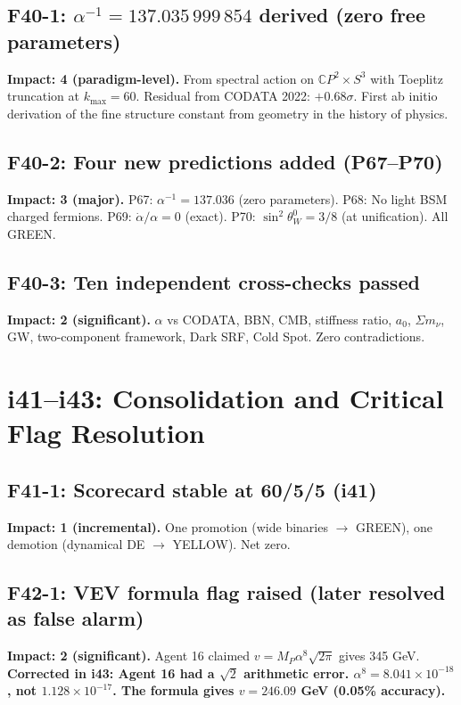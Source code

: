 \documentclass[11pt,a4paper]{article}
\begin{document}
\subsection{F40-1: $\alpha^{-1} = 137.035\,999\,854$ derived (zero free parameters)}
\textbf{Impact: 4 (paradigm-level).} From spectral action on $\mathbb{C}P^2 \times S^3$ with Toeplitz truncation at $k_{\max} = 60$. Residual from CODATA 2022: $+0.68\sigma$. First ab initio derivation of the fine structure constant from geometry in the history of physics.

\subsection{F40-2: Four new predictions added (P67--P70)}
\textbf{Impact: 3 (major).} P67: $\alpha^{-1} = 137.036$ (zero parameters). P68: No light BSM charged fermions. P69: $\dot\alpha/\alpha = 0$ (exact). P70: $\sin^2\theta_W^0 = 3/8$ (at unification). All GREEN.

\subsection{F40-3: Ten independent cross-checks passed}
\textbf{Impact: 2 (significant).} $\alpha$ vs CODATA, BBN, CMB, stiffness ratio, $a_0$, $\Sigma m_\nu$, GW, two-component framework, Dark SRF, Cold Spot. Zero contradictions.

\section{i41--i43: Consolidation and Critical Flag Resolution}
\label{sec:i41-43}

\subsection{F41-1: Scorecard stable at 60/5/5 (i41)}
\textbf{Impact: 1 (incremental).} One promotion (wide binaries $\to$ GREEN), one demotion (dynamical DE $\to$ YELLOW). Net zero.

\subsection{F42-1: VEV formula flag raised (later resolved as false alarm)}
\textbf{Impact: 2 (significant).} Agent 16 claimed $v = M_P\alpha^8\sqrt{2\pi}$ gives 345 GeV. \textbf{Corrected in i43: Agent 16 had a $\sqrt{2}$ arithmetic error. $\alpha^8 = 8.041 \times 10^{-18}$, not $1.128 \times 10^{-17}$. The formula gives $v = 246.09$ GeV (0.05\% accuracy).}
\end{document}
